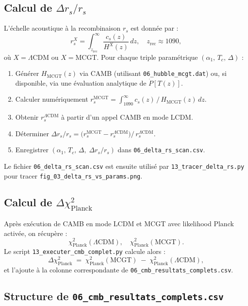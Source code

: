 \subsection{Calcul de \(\Delta r_{s}/r_{s}\)}
L’échelle acoustique à la recombinaison \(r_{s}\) est donnée par :
\[
  r_{s}^{X}
  =
  \int_{z_{\mathrm{rec}}}^{\infty} \frac{c_{s}(z)}{H^{X}(z)}\,dz,
  \quad
  z_{\mathrm{rec}}\approx1090,
\]
où \(X=\Lambda\mathrm{CDM}\) ou \(X=\mathrm{MCGT}\).
Pour chaque triple paramétrique \((\alpha_{1},\,T_{c},\,\Delta)\) :
\begin{enumerate}
  \item Générer \(H_{\mathrm{MCGT}}(z)\) via CAMB (utilisant \texttt{06\_hubble\_mcgt.dat})
        ou, si disponible, via une évaluation analytique de \(\dot P[T(z)]\).
  \item Calculer numériquement
        \(\displaystyle r_{s}^{\mathrm{MCGT}}
         = \int_{1090}^{\infty} c_{s}(z)\,/\,H_{\mathrm{MCGT}}(z)\,dz.\)
  \item Obtenir \(r_{s}^{\Lambda\mathrm{CDM}}\) à partir d’un appel CAMB en mode LCDM.
  \item Déterminer
        \(\displaystyle
          \Delta r_{s}/r_{s}
          =
          \bigl(r_{s}^{\mathrm{MCGT}} - r_{s}^{\Lambda\mathrm{CDM}}\bigr)
/\,r_{s}^{\Lambda\mathrm{CDM}}.\)
  \item Enregistrer \((\alpha_{1},\,T_{c},\,\Delta,\;\Delta r_{s}/r_{s})\)
        dans \texttt{06\_delta\_rs\_scan.csv}.
\end{enumerate}
Le fichier \texttt{06\_delta\_rs\_scan.csv} est ensuite utilisé par
\texttt{13\_tracer\_delta\_rs.py} pour tracer
\texttt{fig\_03\_delta\_rs\_vs\_params.png}.

\subsection{Calcul de \(\Delta\chi^{2}_{\mathrm{Planck}}\)}
Après exécution de CAMB en mode LCDM et MCGT avec likelihood Planck activée, on récupère :
\[
  \chi^{2}_{\mathrm{Planck}}(\Lambda\mathrm{CDM}),
  \quad
  \chi^{2}_{\mathrm{Planck}}(\mathrm{MCGT}).
\]
Le script \texttt{13\_executer\_cmb\_complet.py} calcule alors :
\[
  \Delta\chi^{2}_{\mathrm{Planck}}
  \;=\;
  \chi^{2}_{\mathrm{Planck}}(\mathrm{MCGT})
  \;-\;
  \chi^{2}_{\mathrm{Planck}}(\Lambda\mathrm{CDM}),
\]
et l’ajoute à la colonne correspondante de
\texttt{06\_cmb\_resultats\_complets.csv}.

\subsection{Structure de \texttt{06\_cmb\_resultats\_complets.csv}}


